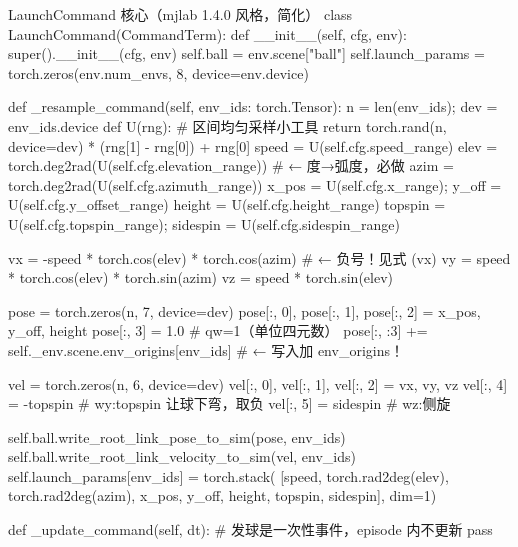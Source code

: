 \begin{codebox}[Python]{LaunchCommand 核心（mjlab 1.4.0 风格，简化）}
class LaunchCommand(CommandTerm):
    def __init__(self, cfg, env):
        super().__init__(cfg, env)
        self.ball = env.scene["ball"]
        self.launch_params = torch.zeros(env.num_envs, 8, device=env.device)

    def _resample_command(self, env_ids: torch.Tensor):
        n = len(env_ids); dev = env_ids.device
        def U(rng):  # 区间均匀采样小工具
            return torch.rand(n, device=dev) * (rng[1] - rng[0]) + rng[0]
        speed   = U(self.cfg.speed_range)
        elev    = torch.deg2rad(U(self.cfg.elevation_range))  # ← 度→弧度，必做
        azim    = torch.deg2rad(U(self.cfg.azimuth_range))
        x_pos   = U(self.cfg.x_range);   y_off = U(self.cfg.y_offset_range)
        height  = U(self.cfg.height_range)
        topspin = U(self.cfg.topspin_range); sidespin = U(self.cfg.sidespin_range)

        vx = -speed * torch.cos(elev) * torch.cos(azim)   # ← 负号！见式 (vx)
        vy =  speed * torch.cos(elev) * torch.sin(azim)
        vz =  speed * torch.sin(elev)

        pose = torch.zeros(n, 7, device=dev)
        pose[:, 0], pose[:, 1], pose[:, 2] = x_pos, y_off, height
        pose[:, 3] = 1.0                                   # qw=1（单位四元数）
        pose[:, :3] += self._env.scene.env_origins[env_ids]  # ← 写入加 env_origins！

        vel = torch.zeros(n, 6, device=dev)
        vel[:, 0], vel[:, 1], vel[:, 2] = vx, vy, vz
        vel[:, 4] = -topspin                              # wy:topspin 让球下弯，取负
        vel[:, 5] =  sidespin                             # wz:侧旋

        self.ball.write_root_link_pose_to_sim(pose, env_ids)
        self.ball.write_root_link_velocity_to_sim(vel, env_ids)
        self.launch_params[env_ids] = torch.stack(
            [speed, torch.rad2deg(elev), torch.rad2deg(azim),
             x_pos, y_off, height, topspin, sidespin], dim=1)

    def _update_command(self, dt):  # 发球是一次性事件，episode 内不更新
        pass
\end{codebox}


